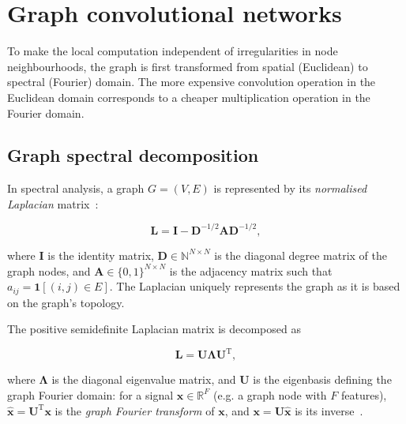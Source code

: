 \section{Graph convolutional networks}
\label{training-gcn}

To make the local computation independent of irregularities in node neighbourhoods, the graph is first transformed from spatial (Euclidean) to spectral (Fourier) domain. The more expensive convolution operation in the Euclidean domain corresponds to a cheaper multiplication operation in the Fourier domain.

\subsection{Graph spectral decomposition}

In spectral analysis, a graph $G = (V, E)$ is represented by its \textit{normalised Laplacian} matrix~\cite{defferrard2016convolutional}: 

\begin{equation}
    \mathbf{L} = \mathbf{I} - \mathbf{D}^{-1/2}\mathbf{A}\mathbf{D}^{-1/2},
\end{equation}

where $\mathbf{I}$ is the identity matrix, $\mathbf{D} \in \mathbb{N}^{N \times N}$ is the diagonal degree matrix of the graph nodes, and $\mathbf{A} \in \{0, 1\}^{N \times N}$ is the adjacency matrix such that $a_{ij} = \mathbf{1}[(i, j) \in E]$. The Laplacian uniquely represents the graph as it is based on the graph's topology.

The positive semidefinite Laplacian matrix is decomposed as

\begin{equation}
    \mathbf{L} = \mathbf{U\Lambda U}^\mathrm{T},
\end{equation}

where $\mathbf{\Lambda}$ is the diagonal eigenvalue matrix, and $\mathbf{U}$ is the eigenbasis defining the graph Fourier domain: for a signal $\mathbf{x} \in \mathbb{R}^{F}$ (e.g. a graph node with $F$ features), $\mathbf{\hat{x}} = \mathbf{U}^\mathrm{T}\mathbf{x}$ is the \textit{graph Fourier transform} of $\mathbf{x}$, and $\mathbf{x} = \mathbf{U}\mathbf{\hat{x}}$ is its inverse~\cite{wu2019simplifying}.


